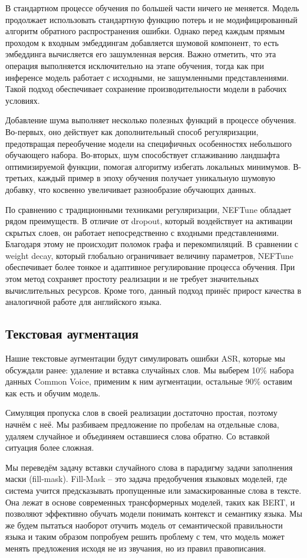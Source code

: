 В стандартном процессе обучения по большей части ничего не меняется.
Модель продолжает использовать стандартную функцию потерь и не модифицированный алгоритм обратного распространения ошибки.
Однако перед каждым прямым проходом к входным эмбеддингам добавляется шумовой компонент, то есть эмбеддинга вычисляется его зашумленная версия.
Важно отметить, что эта операция выполняется исключительно на этапе обучения, тогда как при инференсе модель работает с исходными, не зашумленными представлениями.
Такой подход обеспечивает сохранение производительности модели в рабочих условиях.

Добавление шума выполняет несколько полезных функций в процессе обучения.
Во-первых, оно действует как дополнительный способ регуляризации, предотвращая переобучение модели на специфичных особенностях небольшого обучающего набора.
Во-вторых, шум способствует сглаживанию ландшафта оптимизируемой функции, помогая алгоритму избегать локальных минимумов.
В-третьих, каждый пример в эпоху обучения получает уникальную шумовую добавку, что косвенно увеличивает разнообразие обучающих данных.

По сравнению с традиционными техниками регуляризации, NEFTune обладает рядом преимуществ.
В отличие от dropout, который воздействует на активации скрытых слоев, он работает непосредственно с входными представлениями.
Благодаря этому не происходит поломок графа  и перекомпиляций.
В сравнении с weight decay, который глобально ограничивает величину параметров, NEFTune обеспечивает более тонкое и адаптивное регулирование процесса обучения.
При этом метод сохраняет простоту реализации и не требует значительных вычислительных ресурсов.
Кроме того, данный подход принёс прирост качества в аналогичной работе для английского языка.

\subsection{Текстовая аугментация}
Нашие текстовые аугментации будут симулировать ошибки ASR, которые мы обсуждали ранее: удаление и вставка случайных слов.
Мы выберем 10\% набора данных Common Voice, применим к ним аугментации, остальные 90\% оставим как есть и обучим модель.

Симуляция пропуска слов в своей реализации достаточно простая, поэтому начнём с неё.
Мы разбиваем предложение по пробелам на отдельные слова, удаляем случайное и объединяем оставшиеся слова обратно.
Со вставкой ситуация более сложная.

Мы переведём задачу вставки случайного слова в парадигму задачи заполнения маски (fill-mask).
Fill-Mask -- это задача предобучения языковых моделей, где система учится предсказывать пропущенные или замаскированные слова в тексте.
Она лежат в основе современных трансформерных моделей, таких как BERT\cite{devlin2019bert}, и позволяют эффективно обучать модели понимать контекст и семантику языка.
Мы же будем пытаться наоборот отучить модель от семантической правильности языка и таким образом попробуем решить проблему с тем, что модель может менять предложения исходя не из звучания, но из правил правописания.

